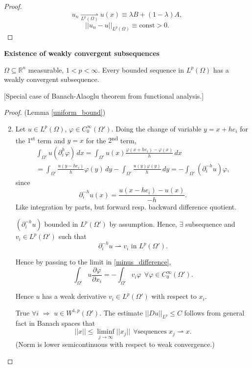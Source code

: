 \documentclass[12pt]{article}
\theoremstyle{definition}
\begin{document}
\begin{proof}
\[u_n\underset{L^p(\Omega)}{\rightharpoonup}u(x)\equiv\lambda B+(1-\lambda)A,\]
\[||u_n-u||_{L^p(\Omega)}\equiv\text{const}>0.\]
\end{proof}

\textbf{Existence of weakly convergent subsequences}

$\Omega\subseteq\mathbb{R}^n$ measurable, $1<p<\infty$. Every bounded sequence in $L^p(\Omega)$ has a weakly convergent subsequence.

[Special case of Banach-Alaoglu theorem from functional analysis.]

\begin{proof}
(Lemma \ref{uniform_bound})
\begin{enumerate}[label=(\roman*)]
\setcounter{enumi}{1}
\item Let $u\in L^p(\Omega)$, $\varphi\in C_0^{\infty}(\Omega')$. Doing the change of variable $y=x+he_i$ for the $1$\textsuperscript{st} term and $y=x$ for the $2$\textsuperscript{nd} term,
\begin{multline}\tag{$*$}\label{minus_difference}
\int_{\Omega'}u(\partial_i^h\varphi)\,dx=\int_{\Omega'}u(x)\frac{\varphi(x+he_i)-\varphi(x)}{h}\,dx\\
=\int_{\Omega'}\frac{u(y-he_i)}{h}\varphi(y)\,dy-\int_{\Omega'}\frac{u(y)\varphi(y)}{h}\,dy=-\int_{\Omega'}(\partial_i^{-h}u)\varphi,
\end{multline}
since
\[\partial_i^{-h}u(x)=\frac{u(x-he_i)-u(x)}{-h}.\]
Like integration by parts, but forward resp. backward difference quotient.

$(\partial_i^{-h}u)$ bounded in $L^p(\Omega')$ by assumption. Hence, $\exists$ subsequence and $v_i\in L^p(\Omega')$ such that
\[\partial_i^{-h}u\rightharpoonup v_i\text{ in }L^p(\Omega').\]

Hence by passing to the limit in \eqref{minus_difference},
\[\int_{\Omega'}u\frac{\partial\varphi}{\partial x_i}=-\int_{\Omega'}v_i\varphi\ \ \forall\varphi\in C_0^{\infty}(\Omega').\]

Hence $u$ has a weak derivative $v_i\in L^p(\Omega')$ with respect to $x_i$.

True $\forall i$ $\Rightarrow$ $u\in W^{1,p}(\Omega')$. The estimate $||Du||_{L^p}\leq C$ follows from general fact in Banach spaces that
\[||x||\leq\liminf_{j\to\infty}||x_j||\ \ \forall\text{sequences }x_j\rightharpoonup x.\]
(Norm is lower semicontinuous with respect to weak convergence.)
\end{enumerate}
\end{proof}
\end{document}

